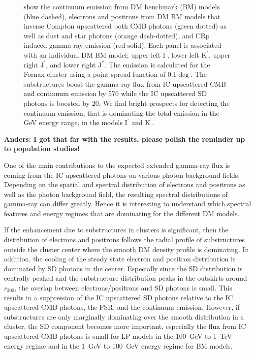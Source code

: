 \documentclass[10pt,aps,pra,reprint,amsmath,amsfonts,amssymb,showpacs,nofootinbib,floatfix]{revtex4-1}
\def\del#1{{}}
\newcommand{\rmn}{\mathrm}
\newcommand{\Kp}{\rmn{K}^\prime}
\newcommand{\Ip}{\rmn{I}^\prime}
\newcommand{\Js}{\rmn{J}^*}
\newcommand{\Jp}{\rmn{J}^\prime}
\newcommand{\rvir}{r_{200}}
\begin{document}
\begin{figure}
\begin{minipage}{2.0\columnwidth}
{  show the continuum emission from DM benchmark (BM) models (blue
  dashed), electrons and positrons from DM BM models that inverse
  Compton upscattered both CMB photons (green dotted) as well as dust
  and star photons (orange dash-dotted), and CRp induced gamma-ray
  emission (red solid). Each panel is associated with an individual DM
  BM model; upper left $\Ip$, lower left $\Kp$, upper right $\Jp$, and
  lower right $\Js$. The emission is calculated for the Fornax cluster
  using a point spread function of $0.1\deg$. The substructures boost
  the gamma-ray flux from IC upscattered CMB and continuum emission by
  570 while the IC upscattered SD photons is boosted by 20. We find
  bright prospects for detecting the continuum emission, that is
  dominating the total emission in the GeV energy range, in the models
  $\Ip$ and $\Kp$.}
 \label{fig:diff_BM}
\end{minipage}
\end{figure}

{\bf Anders: I got that far with the results, please polish the reminder up to population studies!}


\del{CONSIDER REWRITING, START WITH PHYSICS, THEN DISCUSS DOMINATING
CONTRIBUTIONS, PEAKS, AND SPECTRAL INDICES}

One of the main contributions to the expected extended gamma-ray flux
is coming from the IC upscattered photons on various photon background
fields. Depending on the spatial and spectral distribution of
electrons and positrons as well as the photon background field, the
resulting spectral distributions of gamma-ray can differ
greatly. Hence it is interesting to understand which spectral features
and energy regimes that are dominating for the different DM models.

If the enhancement due to substructures in clusters is significant,
then the distribution of electrons and positrons follows the radial
profile of substructures outside the cluster center where the smooth
DM density profile is dominating. In addition, the cooling of the
steady state electron and positron distribution is dominated by SD
photons in the center. Especially since the SD distribution is
centrally peaked and the substructure distribution peaks in the
outskirts around $\rvir$, the overlap between electrons/positrons and
SD photons is small. This results in a suppression of the IC
upscattered SD photons relative to the IC upscattered CMB photons, the
FSR, and the continuum emission. However, if substructures are only
marginally dominating over the smooth distribution in a cluster, the
SD component becomes more important, especially the flux from IC
upscattered CMB photons is small for LP models in the 100~GeV to 1~TeV
energy regime and in the 1~GeV to 100~GeV energy regime for BM models.
\end{document}
